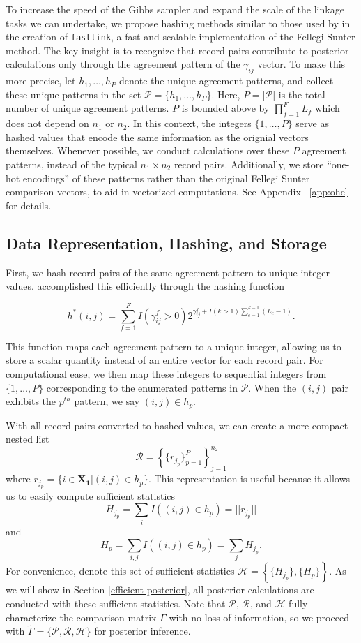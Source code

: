 \documentclass[ba]{imsart}
\begin{document}
To increase the speed of the Gibbs sampler and expand the scale of the linkage tasks we can undertake, we propose hashing methods similar to those used by \cite{enamorado2019using} in the creation of \texttt{fastlink}, a fast and scalable implementation of the Fellegi Sunter method. The key insight is to recognize that record pairs contribute to posterior calculations only through the agreement pattern of the $\gamma_{ij}$ vector. To make this more precise, let $h_1, \ldots, h_P$ denote the unique agreement patterns, and collect these unique patterns in the set $\mathcal{P} = \{h_1, \ldots, h_P\}$. Here,  $P = |\mathcal{P}|$ is the total number of unique agreement patterns. \(P\) is bounded above by \(\prod_{f=1}^F L_f\) which does not depend on \(n_1\) or \(n_2\). In this context, the integers $\{1, \ldots, P\}$ serve as hashed values that encode the same information as the orignial vectors themselves. Whenever possible, we conduct calculations over these \(P\) agreement patterns, instead of the typical \(n_1 \times n_2\) record pairs. Additionally, we store ``one-hot encodings'' of these patterns rather than the original Fellegi Sunter comparison vectors, to aid in vectorized computations. See Appendix ~\ref{app:ohe} for details.   

\hypertarget{data-representation-hashing-and-storage}{%
	\subsection{Data Representation, Hashing, and
		Storage}\label{data-representation-hashing-and-storage}}

First, we hash record pairs of the same agreement pattern to unique integer values. \cite{enamorado2019using} accomplished this efficiently through the hashing function

$$h^{*}(i, j) = \sum_{f = 1}^F I(\gamma_{ij}^f > 0)2^{\gamma_{ij}^f + I(k>1)\sum_{e=1}^{k-1}(L_e -1)}.$$

This function maps each agreement pattern to a unique integer, allowing us to store a scalar quantity instead of an entire vector for each record pair. For computational ease, we then map these integers to sequential integers from $\{1, \ldots, P\}$ corresponding to the enumerated patterns in $\mathcal{P}$. When the $(i, j)$ pair exhibits the $p^{th}$ pattern, we say $(i, j) \in h_p$.

With all record pairs converted to hashed values, we can create a more compact nested list 
$$\mathcal{R} = \left\{\{r_{j_p} \}_{p=1}^{P} \right\}_{j = 1}^{n_2}$$
where $r_{j_p} = \{i \in \bm{X_1} | (i, j) \in h_p\}$. This representation is useful because it allows us to easily compute sufficient statistics
$$H_{j_p} = \sum_{i} I((i, j) \in h_p) = ||r_{j_p}||$$
and
$$H_p =  \sum_{i, j} I((i, j) \in h_p) = \sum_{j} H_{j_p}.$$
For convenience, denote this set of sufficient statistics $\mathcal{H} = \left\{\{H_{j_p}\}, \{H_{p}\}\right\}.$ As we will show in Section \ref{efficient-posterior}, all posterior calculations are conducted with these sufficient statistics. Note that $\mathcal{P}$, $\mathcal{R}$, and $\mathcal{H}$  fully characterize the comparison matrix $\Gamma$ with no loss of information, so we proceed with $\tilde{\Gamma} = \{\mathcal{P}, \mathcal{R}, \mathcal{H}\}$ for posterior inference. 
\end{document}
